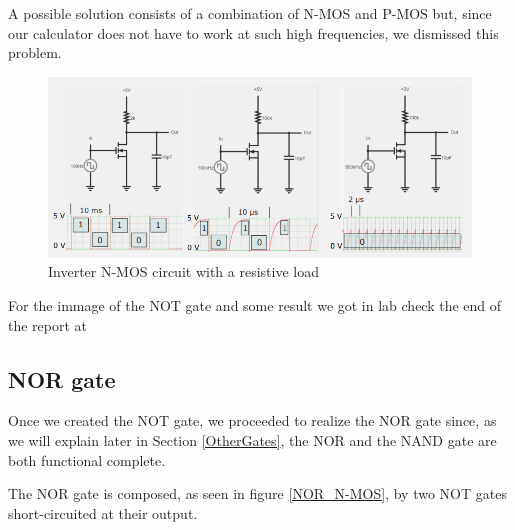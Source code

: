 \documentclass{article}
\begin{document}
A possible solution consists of a combination of N-MOS and P-MOS but, since our calculator does not have to work at such high frequencies, we dismissed this problem.

\begin{figure}[h]
    \centering
    \includegraphics[scale=0.6]{IM_inverter_esa.PNG}
    \caption{Inverter N-MOS circuit with a resistive load}
    \label{ResistiveInverter}
\end{figure}

For the immage of the NOT gate and some result we got in lab check the end of the report at %


\clearpage
\subsection{NOR gate}

Once we created the NOT gate, we proceeded to realize the NOR gate since, as we will explain later in Section \ref{OtherGates}, the NOR and the NAND gate are both functional complete.

\vspace{1mm}

The NOR gate is composed, as seen in figure \ref{NOR_N-MOS}, by two NOT gates short-circuited at their output.
\end{document}
